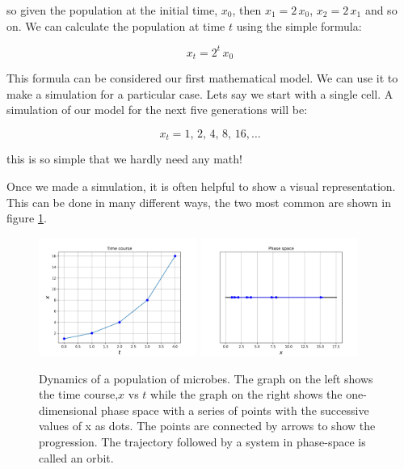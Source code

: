\documentclass[12pt]{article}
\begin{document}
so given the population at the initial time,  $x_0$, then $x_1=2\, x_0$, $x_2=2\, x_1$ and so on. We can calculate the population at time $t$ using the simple formula:

\begin{equation}
	x_{t} = 2^t \, x_0
\end{equation}

This formula can be considered our first mathematical model. We can use it to make a simulation for a particular case. Lets say we start with a single cell. A simulation of our model for the next five generations will be:

\begin{equation}
	x_{t} =1 ,\, 2 ,\,4 ,\,8 ,\,16,\dots
\end{equation}

this is so simple that we hardly need any math!

Once we made a simulation, it is often helpful to show a visual representation. This can be done in many different ways, the two most common are shown in figure \ref{fig:tcourse}. 


\begin{figure}
	\begin{center}
		\includegraphics[width=0.46\textwidth]{time_course}
		\includegraphics[width=0.46\textwidth]{phase_space}
	\end{center}
	\caption{Dynamics of a population of microbes. The graph on the left shows the time course,$x$ vs $t$ while the graph on the right shows the one-dimensional phase space with a series of points with the successive values of x as dots. The points are connected by arrows to show the progression. The trajectory followed by a system in phase-space is called an orbit.}
	\label{fig:tcourse}
\end{figure}
\end{document}
